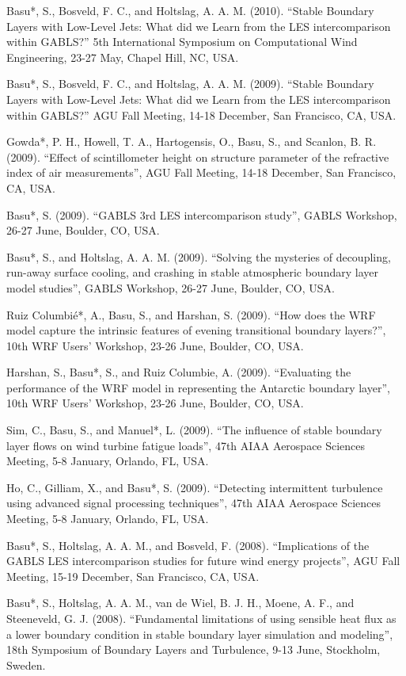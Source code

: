\begin{etaremune}[topsep=0pt,itemsep=0pt,partopsep=0pt,parsep=0pt]
\item Basu*, S., Bosveld, F. C., and Holtslag, A. A. M. (2010). ``Stable Boundary Layers with Low-Level Jets: What did we Learn from the LES intercomparison within GABLS?'' 5th International Symposium on Computational Wind Engineering, 23-27 May, Chapel Hill, NC, USA.
\item Basu*, S., Bosveld, F. C., and Holtslag, A. A. M. (2009). ``Stable Boundary Layers with Low-Level Jets: What did we Learn from the LES intercomparison within GABLS?'' AGU Fall Meeting, 14-18 December, San Francisco, CA, USA.
\item Gowda*, P. H., Howell, T. A., Hartogensis, O., Basu, S., and Scanlon, B. R. (2009). ``Effect of scintillometer height on structure parameter of the refractive index of air measurements'', AGU Fall Meeting, 14-18 December, San Francisco, CA, USA. 
\item Basu*, S. (2009). ``GABLS 3rd LES intercomparison study'', GABLS Workshop, 26-27 June, Boulder, CO, USA. 
\item Basu*, S., and Holtslag, A. A. M. (2009). ``Solving the mysteries of decoupling, run-away surface cooling, and crashing in stable atmospheric boundary layer model studies'', GABLS Workshop, 26-27 June, Boulder, CO, USA. 
\item Ruiz Columbi\'{e}*, A., Basu, S., and Harshan, S. (2009). ``How does the WRF model capture the intrinsic features of evening transitional boundary layers?'', 10th WRF Users' Workshop, 23-26 June, Boulder, CO, USA. 
\item Harshan, S., Basu*, S., and Ruiz Columbie, A. (2009). ``Evaluating the performance of the WRF model in representing the Antarctic boundary layer'', 10th WRF Users’ Workshop, 23-26 June, Boulder, CO, USA.
\item Sim, C., Basu, S., and Manuel*, L. (2009). ``The influence of stable boundary layer flows on wind turbine fatigue loads'', 47th AIAA Aerospace Sciences Meeting, 5-8 January, Orlando, FL, USA. 
\item Ho, C., Gilliam, X., and Basu*, S. (2009). ``Detecting intermittent turbulence using advanced signal processing techniques'', 47th AIAA Aerospace Sciences Meeting, 5-8 January, Orlando, FL, USA. 
\item Basu*, S., Holtslag, A. A. M., and Bosveld, F. (2008). ``Implications of the GABLS LES intercomparison studies for future wind energy projects'', AGU Fall Meeting, 15-19 December, San Francisco, CA, USA.
\item Basu*, S., Holtslag, A. A. M., van de Wiel, B. J. H., Moene, A. F., and Steeneveld, G. J. (2008). ``Fundamental limitations of using sensible heat flux as a lower boundary condition in stable boundary layer simulation and modeling'', 18th Symposium of Boundary Layers and Turbulence, 9-13 June, Stockholm, Sweden.

\end{etaremune}
